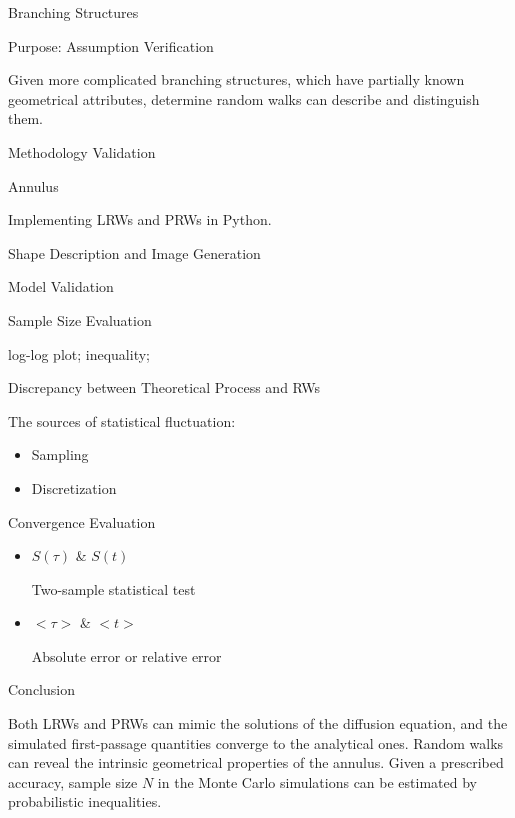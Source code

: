 \documentclass{article}
\begin{document}
\begin{outline}[enumerate]
           \3 Branching Structures 

             \4 Purpose: Assumption Verification
               \par
               Given more complicated branching structures, which have partially known geometrical attributes, determine random walks can describe and distinguish them.
               
              
    \1 Methodology Validation

       \2 Annulus
          \par
          Implementing LRWs and PRWs in Python.
          
         \3 Shape Description and Image Generation
          
         \3 Model Validation

            \4 Sample Size Evaluation
              \par
              log-log plot; inequality; 
         
            \4 Discrepancy between Theoretical Process and RWs \cite{binder2012monte}
              \par
              The sources of statistical fluctuation:  
               \begin{itemize}
                 \item Sampling
                 \item Discretization  
               \end{itemize}
                        
            \4 Convergence Evaluation 
               \begin{itemize}
                  \item $S(\tau)$ \& $S(t)$
                    \par
                    Two-sample statistical test
                  \item $<\tau>$ \& $<t>$
                    \par
                    Absolute error or relative error                   
               \end{itemize}
                         
         \3 Conclusion
               
           \4 Both LRWs and PRWs can mimic the solutions of the diffusion equation, and the simulated first-passage quantities converge to the analytical ones.
           \4 Random walks can reveal the intrinsic geometrical properties of the annulus.
           \4 Given a prescribed accuracy, sample size $N$ in the Monte Carlo simulations can be estimated by probabilistic inequalities.


\end{outline}
\end{document}
